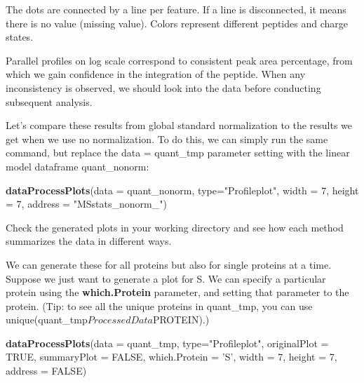 \documentclass[]{book}
\newenvironment{Shaded}{\begin{snugshade}}{\end{snugshade}}
\newcommand{\DataTypeTok}[1]{\textcolor[rgb]{0.13,0.29,0.53}{#1}}
\newcommand{\DecValTok}[1]{\textcolor[rgb]{0.00,0.00,0.81}{#1}}
\newcommand{\KeywordTok}[1]{\textcolor[rgb]{0.13,0.29,0.53}{\textbf{#1}}}
\newcommand{\NormalTok}[1]{#1}
\newcommand{\OtherTok}[1]{\textcolor[rgb]{0.56,0.35,0.01}{#1}}
\newcommand{\StringTok}[1]{\textcolor[rgb]{0.31,0.60,0.02}{#1}}
\begin{document}
The dots are connected by a line per feature. If a line is disconnected, it means there is no value (missing value). Colors represent different peptides and charge states.

Parallel profiles on log scale correspond to consistent peak area percentage, from which we gain confidence in the integration of the peptide. When any inconsistency is observed, we should look into the data before conducting subsequent analysis.

Let's compare these results from global standard normalization to the results we get when we use no normalization. To do this, we can simply run the same command, but replace the data = quant\_tmp parameter setting with the linear model dataframe quant\_nonorm:

\begin{Shaded}
\begin{Highlighting}[]
\KeywordTok{dataProcessPlots}\NormalTok{(}\DataTypeTok{data =}\NormalTok{ quant_nonorm, }\DataTypeTok{type=}\StringTok{"Profileplot"}\NormalTok{, }
                 \DataTypeTok{width =} \DecValTok{7}\NormalTok{, }\DataTypeTok{height =} \DecValTok{7}\NormalTok{, }\DataTypeTok{address =} \StringTok{"MSstats_nonorm_"}\NormalTok{)}
\end{Highlighting}
\end{Shaded}

Check the generated plots in your working directory and see how each method summarizes the data in different ways.

We can generate these for all proteins but also for single proteins at a time. Suppose we just want to generate a plot for S. We can specify a particular protein using the \textbf{which.Protein} parameter, and setting that parameter to the protein. (Tip: to see all the unique proteins in quant\_tmp, you can use unique(quant\_tmp\(ProcessedData\)PROTEIN).)

\begin{Shaded}
\begin{Highlighting}[]
\KeywordTok{dataProcessPlots}\NormalTok{(}\DataTypeTok{data =}\NormalTok{ quant_tmp, }\DataTypeTok{type=}\StringTok{"Profileplot"}\NormalTok{, }
                 \DataTypeTok{originalPlot =} \OtherTok{TRUE}\NormalTok{, }\DataTypeTok{summaryPlot =} \OtherTok{FALSE}\NormalTok{,}
                 \DataTypeTok{which.Protein =} \StringTok{'S'}\NormalTok{,}
                 \DataTypeTok{width =} \DecValTok{7}\NormalTok{, }\DataTypeTok{height =} \DecValTok{7}\NormalTok{, }\DataTypeTok{address =} \OtherTok{FALSE}\NormalTok{)}
\end{Highlighting}
\end{Shaded}
\end{document}
